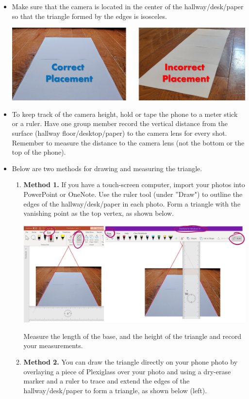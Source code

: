 \documentclass{ximera}
\begin{document}
\begin{itemize}
    \item Make sure that the camera is located in the center of the hallway/desk/paper so that the triangle formed by the edges is isosceles.
    \begin{image}
         \includegraphics[width=5in]{paperPlacement.jpg}
\end{image}
\item To keep track of the camera height, hold or tape the phone to a meter stick or a ruler. Have one group member record the vertical distance from the surface (hallway floor/desktop/paper) to the camera lens for every shot.  Remember to measure the distance to the camera lens (not the bottom or the top of the phone).
\item Below are two methods for drawing and measuring the triangle.
\begin{enumerate}
    \item \textbf{Method 1.} If you have a touch-screen computer, import your photos into PowerPoint or OneNote.  Use the ruler tool (under ''Draw") to outline the edges of the hallway/desk/paper in each photo. Form a triangle with the vanishing point as the top vertex, as shown below.

    \begin{image}
         \includegraphics[width=5in]{rulerUse.jpg}
\end{image}

Measure the length of the base, and the height of the triangle and record your measurements.
\item \textbf{Method 2.} You can draw the triangle directly on your phone photo by overlaying a piece of Plexiglass over your photo and using a dry-erase marker and a ruler to trace and extend the edges of the hallway/desk/paper to form a triangle, as shown below (left).


\end{enumerate}
\end{itemize}
\end{document}
